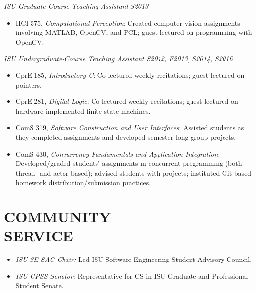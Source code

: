 \documentclass[margin, 10pt]{res} %
\begin{document}
\begin{resume}
{\sl ISU Graduate-Course Teaching Assistant}         \hfill {\sl S2013}
  \begin{itemize} \itemsep -1pt
    \item HCI 575, {\sl Computational Perception}: Created computer vision
          assignments involving MATLAB, OpenCV, and PCL; guest lectured on
          programming with OpenCV.
  \end{itemize}

{\sl ISU Undergraduate-Course Teaching Assistant}    \hfill {\sl S2012, F2013,
                                                            S2014, S2016}
  \begin{itemize} \itemsep -1pt
    \item CprE 185, {\sl Introductory C}: Co-lectured weekly recitations; guest
          lectured on pointers.
    \item CprE 281, {\sl Digital Logic}: Co-lectured weekly recitations; guest
          lectured on hardware-implemented finite state machines.
    \item ComS 319, {\sl Software Construction and User Interfaces}: Assisted
          students as they completed assignments and developed semester-long
          group projects.
    \item ComS 430, {\sl Concurrency Fundamentals and Application Integration}:
          Developed/graded students' assignments in concurrent programming
          (both thread- and actor-based); advised students with projects;
          instituted Git-based homework distribution/submission practices.
  \end{itemize}



\section{COMMUNITY \\ SERVICE}

  \begin{itemize}
    \item {\sl ISU SE SAC Chair:} Led ISU Software Engineering Student Advisory
          Council.
    \item {\sl ISU GPSS Senator:} Representative for CS in ISU Graduate and
          Professional Student Senate.
  \end{itemize}


\end{resume}
\end{document}
